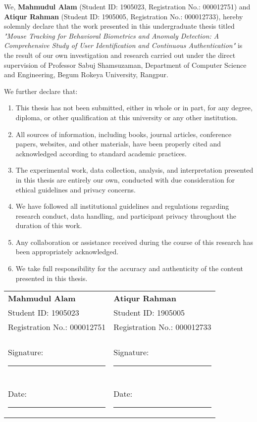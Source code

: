 \documentclass[
  12pt,
  a4paper,
]{report}
\begin{document}
\vspace{2cm}

We, \textbf{Mahmudul Alam} (Student ID: 1905023, Registration No.:
000012751) and \textbf{Atiqur Rahman} (Student ID: 1905005, Registration
No.: 000012733), hereby solemnly declare that the work presented in this
undergraduate thesis titled
\textit{"Mouse Tracking for Behavioral Biometrics and Anomaly Detection: A Comprehensive Study of User Identification and Continuous Authentication"}
is the result of our own investigation and research carried out under
the direct supervision of Professor Sabuj Shamsuzaman, Department of
Computer Science and Engineering, Begum Rokeya University, Rangpur.

We further declare that:

\begin{enumerate}
\item This thesis has not been submitted, either in whole or in part, for any degree, diploma, or other qualification at this university or any other institution.

\item All sources of information, including books, journal articles, conference papers, websites, and other materials, have been properly cited and acknowledged according to standard academic practices.

\item The experimental work, data collection, analysis, and interpretation presented in this thesis are entirely our own, conducted with due consideration for ethical guidelines and privacy concerns.

\item We have followed all institutional guidelines and regulations regarding research conduct, data handling, and participant privacy throughout the duration of this work.

\item Any collaboration or assistance received during the course of this research has been appropriately acknowledged.

\item We take full responsibility for the accuracy and authenticity of the content presented in this thesis.
\end{enumerate}

\vspace{3cm}

\begin{tabular}{p{6cm} p{6cm}}
\textbf{Mahmudul Alam} & \textbf{Atiqur Rahman} \\
Student ID: 1905023 & Student ID: 1905005 \\
Registration No.: 000012751 & Registration No.: 000012733 \\
& \\
Signature: \rule{4cm}{0.5pt} & Signature: \rule{4cm}{0.5pt} \\
& \\
Date: \rule{3cm}{0.5pt} & Date: \rule{3cm}{0.5pt} \\
\end{tabular}
\end{document}
